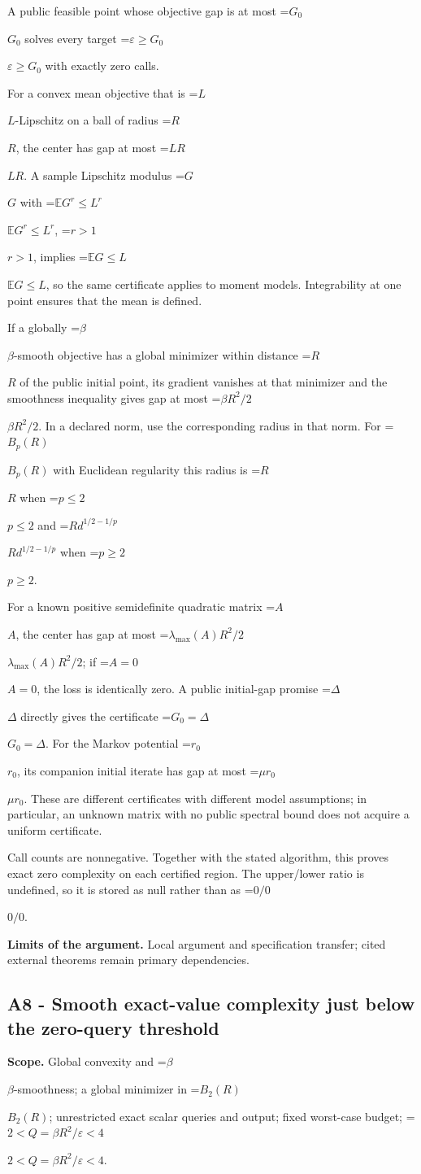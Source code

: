 \documentclass[10pt,a4paper]{article}
\newcommand{\AtlasMath}[1]{\par\begingroup\centering\setbox0=\hbox{$\displaystyle #1$}\ifdim\wd0>1.4\linewidth\typeout{ATLAS WIDE FORMULA: \the\wd0}\fi\ifdim\wd0>\linewidth\resizebox{\linewidth}{!}{\box0}\else\box0\fi\par\endgroup}
\newcommand{\AtlasInlineMath}[1]{\begingroup\setbox0=\hbox{$#1$}\ifdim\wd0>.4\linewidth\endgroup\AtlasMath{#1}\else\endgroup$#1$\fi}
\begin{document}
A public feasible point whose objective gap is at most \AtlasInlineMath{G_0} solves every target \AtlasInlineMath{\varepsilon\ge G_0} with exactly zero calls.

For a convex mean objective that is \AtlasInlineMath{L}-Lipschitz on a ball of radius \AtlasInlineMath{R}, the center has gap at most \AtlasInlineMath{LR}. A sample Lipschitz modulus \AtlasInlineMath{G} with \AtlasInlineMath{\mathbb E G^r\le L^r}, \AtlasInlineMath{r>1}, implies \AtlasInlineMath{\mathbb E G\le L}, so the same certificate applies to moment models. Integrability at one point ensures that the mean is defined.

If a globally \AtlasInlineMath{\beta}-smooth objective has a global minimizer within distance \AtlasInlineMath{R} of the public initial point, its gradient vanishes at that minimizer and the smoothness inequality gives gap at most \AtlasInlineMath{\beta R^2/2}. In a declared norm, use the corresponding radius in that norm. For \AtlasInlineMath{B_p(R)} with Euclidean regularity this radius is \AtlasInlineMath{R} when \AtlasInlineMath{p\le2} and \AtlasInlineMath{R d^{1/2-1/p}} when \AtlasInlineMath{p\ge2}.

For a known positive semidefinite quadratic matrix \AtlasInlineMath{A}, the center has gap at most \AtlasInlineMath{\lambda_{\max}(A)R^2/2}; if \AtlasInlineMath{A=0}, the loss is identically zero. A public initial-gap promise \AtlasInlineMath{\Delta} directly gives the certificate \AtlasInlineMath{G_0=\Delta}. For the Markov potential \AtlasInlineMath{r_0}, its companion initial iterate has gap at most \AtlasInlineMath{\mu r_0}. These are different certificates with different model assumptions; in particular, an unknown matrix with no public spectral bound does not acquire a uniform certificate.

Call counts are nonnegative. Together with the stated algorithm, this proves exact zero complexity on each certified region. The upper/lower ratio is undefined, so it is stored as null rather than as \AtlasInlineMath{0/0}.

\textbf{Limits of the argument.} Local argument and specification transfer; cited external theorems remain primary dependencies.

\subsection{A8 - Smooth exact-value complexity just below the zero-query threshold}
\textbf{Scope.} Global convexity and \AtlasInlineMath{\beta}-smoothness; a global minimizer in \AtlasInlineMath{B_2(R)}; unrestricted exact scalar queries and output; fixed worst-case budget; \AtlasInlineMath{2<Q=\beta R^2/\varepsilon<4}.
\end{document}
